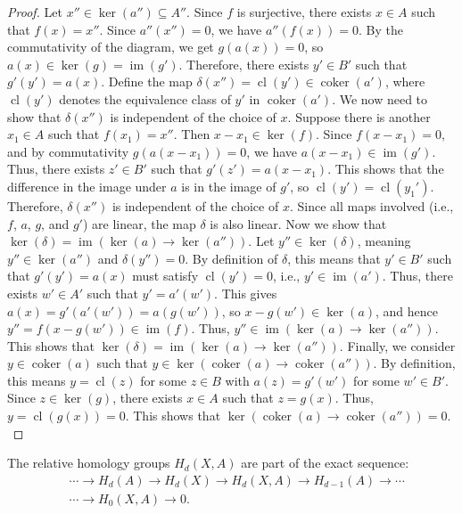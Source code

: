 \begin{proof}
Let \( x'' \in \ker(a'') \subseteq A'' \). Since \( f \) is surjective, there exists \( x \in A \) such that \( f(x) = x'' \). Since \( a''(x'') = 0 \), we have $a''(f(x)) = 0$. By the commutativity of the diagram, we get $g(a(x)) = 0$, so \( a(x) \in \ker(g) = \operatorname{im}(g') \). Therefore, there exists \( y' \in B' \) such that \( g'(y') = a(x) \). Define the map \( \delta(x'') = \operatorname{cl}(y') \in \operatorname{coker}(a') \), where \( \operatorname{cl}(y') \) denotes the equivalence class of \( y' \) in \( \operatorname{coker}(a') \). We now need to show that \( \delta(x'') \) is independent of the choice of \( x \). Suppose there is another \( x_1 \in A \) such that \( f(x_1) = x'' \). Then $x - x_1 \in \ker(f)$. Since \( f(x - x_1) = 0 \), and by commutativity \( g(a(x - x_1)) = 0 \), we have \( a(x - x_1) \in \operatorname{im}(g') \). Thus, there exists \( z' \in B' \) such that \( g'(z') = a(x - x_1) \). This shows that the difference in the image under \( a \) is in the image of \( g' \), so \( \operatorname{cl}(y') = \operatorname{cl}(y_1') \). Therefore, \( \delta(x'') \) is independent of the choice of \( x \). Since all maps involved (i.e., \( f \), \( a \), \( g \), and \( g' \)) are linear, the map \( \delta \) is also linear. Now we show that \( \ker(\delta) = \operatorname{im}(\ker(a) \to \ker(a'')). \) Let \( y'' \in \ker(\delta) \), meaning \( y'' \in \ker(a'') \) and \( \delta(y'') = 0 \). By definition of \( \delta \), this means that \( y' \in B' \) such that \( g'(y') = a(x) \) must satisfy \( \operatorname{cl}(y') = 0 \), i.e., \( y' \in \operatorname{im}(a') \). Thus, there exists \( w' \in A' \) such that \( y' = a'(w') \). This gives $a(x) = g'(a'(w')) = a(g(w'))$, so \( x - g(w') \in \ker(a) \), and hence $y'' = f(x - g(w')) \in \operatorname{im}(f)$. Thus, \( y'' \in \operatorname{im}(\ker(a) \to \ker(a'')). \) This shows that \( \ker(\delta) = \operatorname{im}(\ker(a) \to \ker(a'')). \) Finally, we consider \( y \in \operatorname{coker}(a) \) such that \( y \in \ker(\operatorname{coker}(a) \to \operatorname{coker}(a'')). \) By definition, this means \( y = \operatorname{cl}(z) \) for some \( z \in B \) with \( a(z) = g'(w') \) for some \( w' \in B' \). Since \( z \in \ker(g) \), there exists \( x \in A \) such that \( z = g(x) \). Thus, $y = \operatorname{cl}(g(x)) = 0$. This shows that \( \ker(\operatorname{coker}(a) \to \operatorname{coker}(a'')) = 0. \)
\end{proof}

\begin{theorem}{\cite[p.115f.]{hatcher2005algebraic}}
	The relative homology groups \( H_{d}(X, A) \) are part of the exact sequence:
	\begin{align}
		  & \cdots \rightarrow H_{d}(A) \rightarrow H_{d}(X) \rightarrow H_{d}(X, A) \rightarrow H_{d-1}(A) \rightarrow \cdots \nonumber\\
		  & \cdots \rightarrow H_{0}(X, A) \rightarrow 0.                                                                      
	\end{align}
\end{theorem}


